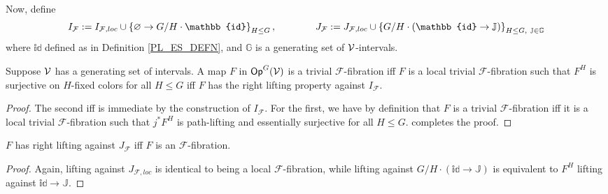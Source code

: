 \documentclass[a4paper,10pt
]{article}%
\renewcommand{\F}{\mathcal F}
\newcommand{\J}{\mathbb J}
\renewcommand{\1}{\ensuremath{\mathbb{id}}}
\begin{document}
Now, define
\begin{equation}
      I_{\F}:= I_{\F, loc} \mathbin{\cup} \set{\varnothing \to G/H \cdot \1}_{H\leq G},
      \qquad \qquad
      J_{\F} := J_{\F, loc} \mathbin{\cup} \set{G/H \cdot (\1 \to \J)}_{H\leq G,\ \J\in\mathbb{G}}
\end{equation}
where $\1$ defined as in Definition \ref{PL_ES_DEFN}, and $\mathbb{G}$ is a generating set of $\mathcal V$-intervals. 

\begin{lemma}
      \label{CAV_4.8}
      Suppose $\mathcal V$ has a generating set of intervals.
      A map $F$ in $\mathsf{Op}^G(\mathcal V)$ is a trivial $\F$-fibration
      iff
      $F$ is a local trivial $\F$-fibration such that $F^H$ is surjective on $H$-fixed colors for all $H\leq G$
      iff
      $F$ has the right lifting property against $I_{\F}$.
\end{lemma}
\begin{proof}
      The second iff is immediate by the construction of $I_{\F}$.
      For the first, we have by definition that
      $F$ is a trivial $\F$-fibration
      iff
      it is a local trivial $\F$-fibration such that $j^*F^H$ is path-lifting and essentially surjective for all $H\leq G$.
      \cite[2.4]{BM13} completes the proof. 
\end{proof}

\begin{lemma}
      $F$ has right lifting against $J_{\F}$ iff $F$ is an $\F$-fibration.
\end{lemma}
\begin{proof}
      Again, lifting against $J_{\F, loc}$ is identical to being a local $\F$-fibration, while lifting against $G/H \cdot (\1 \to \J)$
      is equivalent to $F^H$ lifting against $\1 \to \J$.
\end{proof}
\end{document}
